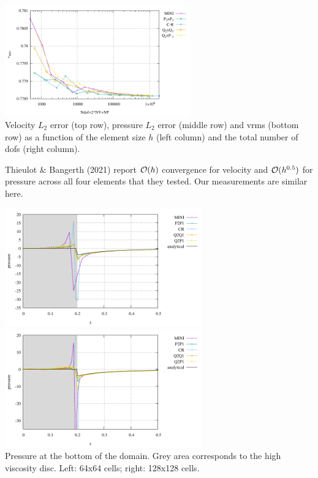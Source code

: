 \begin{center}
\includegraphics[width=8cm]{python_codes/fieldstone_112/results/exp5/vrms_ndof.pdf}\\
{\captionfont Velocity $L_2$ error (top row), pressure $L_2$ error (middle row) and vrms (bottom row) 
as a function of the element size $h$ (left column) and the total number of dofs (right column).}
\end{center}

Thieulot \& Bangerth (2021) \cite{thba21} report ${\cal O}(h)$ convergence for 
velocity and ${\cal O}(h^{0.5})$ for pressure across all four elements that they tested.
Our measurements are similar here.


\begin{center}
\includegraphics[width=8.5cm]{python_codes/fieldstone_112/results/exp5/bottom64}
\includegraphics[width=8.5cm]{python_codes/fieldstone_112/results/exp5/bottom128}\\
{\captionfont Pressure at the bottom of the domain. Grey area corresponds to the 
high viscosity disc. Left: 64x64 cells; right: 128x128 cells.}
\end{center}

